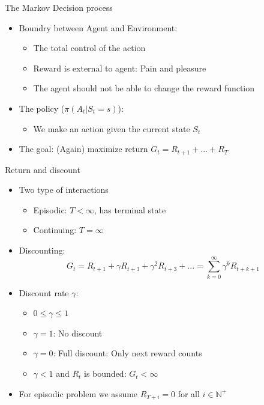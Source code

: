 \documentclass[10pt]{beamer}
\begin{document}
\begin{frame}{The Markov Decision process}

\begin{itemize}
\item Boundry between Agent and Environment:
\begin{itemize}
\item The {\color{uured}total control} of the action\pause
\item Reward is {\color{uured}external} to agent: Pain and pleasure
\item The agent {\color{uured} should not be able to change the reward function}
\end{itemize}
\pause
\item The policy ($\pi(A_t|S_t=s)$):
\begin{itemize}
\item We make an action given the current state $S_t$
\end{itemize}
\item {\color{uured}The goal}: (Again) maximize return $G_t = R_{t+1} + ... + R_{T}$
\end{itemize}

\end{frame}



\begin{frame}{Return and discount}

\begin{itemize}
\item Two type of interactions
\begin{itemize}
\item {\color{uured}Episodic}: $T <\infty$, has terminal state
\item {\color{uured}Continuing}: $T =\infty$
\end{itemize}
\item Discounting:
\[
G_t = R_{t+1} + \gamma R_{t+3} + \gamma^2 R_{t+3} + ... = \sum^\infty_{k=0} \gamma^k R_{t+k+1}
\]
\pause
\item Discount rate $\gamma$:
\begin{itemize}
\item $0 \leq \gamma \leq 1$\pause
\item $\gamma = 1$: {\color{uured}No discount}
\item $\gamma = 0$: {\color{uured}Full discount}: Only next reward counts
\item $\gamma < 1$ and $R_t$ is bounded: $G_t<\infty$
\end{itemize}
\pause
\item For episodic problem we assume $R_{T+i} = 0$ for all $i \in \mathbb{N}^+$
\end{itemize}

\end{frame}
\end{document}
